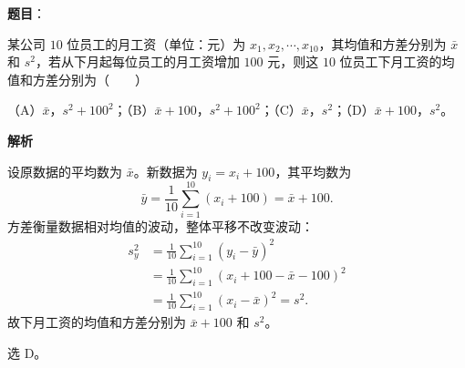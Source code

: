 \begin{answer}

\textbf{题目}：

某公司 $10$ 位员工的月工资（单位：元）为 $x_1,x_2,\cdots,x_{10}$，其均值和方差分别为 $\bar x$ 和 $s^2$，若从下月起每位员工的月工资增加 $100$ 元，则这 $10$ 位员工下月工资的均值和方差分别为\mbox{（　　）}

（A）$\bar x$，$s^2+100^2$；（B）$\bar x+100$，$s^2+100^2$；（C）$\bar x$，$s^2$；（D）$\bar x+100$，$s^2$。

\textbf{解析}

设原数据的平均数为 $\bar x$。新数据为 $y_i=x_i+100$，其平均数为
\nopagebreak[4]
\[\bar y=\frac1{10}\sum_{i=1}^{10}(x_i+100)=\bar x+100.\]
方差衡量数据相对均值的波动，整体平移不改变波动：
\nopagebreak[4]
\[\begin{aligned}
s_y^2&=\frac1{10}\sum_{i=1}^{10}(y_i-\bar y)^2\\
&=\frac1{10}\sum_{i=1}^{10}(x_i+100-\bar x-100)^2\\
&=\frac1{10}\sum_{i=1}^{10}(x_i-\bar x)^2=s^2.
\end{aligned}\]
故下月工资的均值和方差分别为 $\bar x+100$ 和 $s^2$。

选 D。


\end{answer}
